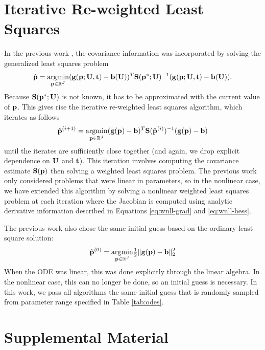 \section{Iterative Re-weighted Least Squares}\label{sec:WENDy-IRLS}

In the previous work \citep{BortzMessengerDukic2023BullMathBiol}, the covariance information was incorporated by solving the generalized least squares problem 
\[ \hat{\mathbf{p}} = \underset{\mathbf{p} \in \mathbb{R}^J}{\operatorname{argmin}} (\mathbf{g}(\mathbf{p};\mathbf{U},\mathbf{t}) - \mathbf{b}(\mathbf{U}))^T\mathbf{S}(\mathbf{p}^*; \mathbf{U})^{-1}(\mathbf{g}(\mathbf{p};\mathbf{U},\mathbf{t}) - \mathbf{b}(\mathbf{U})).\]
Because $\mathbf{S}(\mathbf{p}^*; \mathbf{U})$ is not known, it has to be approximated with the current value of $\mathbf{p}$. This gives rise the iterative re-weighted least squares algorithm, which iterates as follows 
\begin{equation}
	\label{eq:WENDy-IRLSIter}
	\hat{\mathbf{p}}^{(i+1)} = \underset{\mathbf{p} \in \mathbb{R}^J}{\operatorname{argmin}}(\mathbf{g}(\mathbf{p}) - \mathbf{b})^T\mathbf{S}(\hat{\mathbf{p}}^{(i)})^{-1}(\mathbf{g}(\mathbf{p}) - \mathbf{b})
\end{equation}
until the iterates are sufficiently close together (and again, we drop explicit dependence on $\mathbf{U}$ and $\mathbf{t}$).
This iteration involves computing the covariance estimate $\mathbf{S}(\mathbf{p})$ then solving a weighted least squares problem. The previous work \citep{BortzMessengerDukic2023BullMathBiol} only considered problems that were linear in parameters, so in the nonlinear case, we have extended this algorithm by solving a nonlinear weighted least squares problem at each iteration where the Jacobian is computed using analytic derivative information described in Equations \eqref{eq:wnll-grad} and \eqref{eq:wnll-hess}. 

The previous work also chose the same initial guess based on the ordinary least square solution:
\[\hat{\mathbf{p}}^{(0)} = \underset{\mathbf{p} \in \mathbb{R}^J}{\operatorname{argmin}} \tfrac{1}{2}\|\mathbf{g}(\mathbf{p}) - \mathbf{b}\|^2_2\]
When the ODE was linear, this was done explicitly through the linear algebra. In the nonlinear case, this can no longer be done, so an initial guess is necessary. In this work, we pass all algorithms the same initial guess that is randomly sampled from parameter range specified in Table \ref{tab:odes}.
\section{Supplemental Material}
